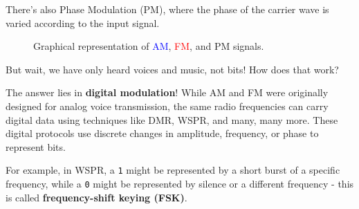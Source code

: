 There's also Phase Modulation (PM), where the phase of the carrier wave is varied according to the input signal.
\begin{figure}[h]
    \centering
    \caption{Graphical representation of \textcolor{blue}{AM}, \textcolor{red}{FM}, and \textcolor{green!50!black}{PM} signals.}\label{fig:modulation_math}
\end{figure}


But wait, we have only heard voices and music, not bits! How does that work?

The answer lies in \textbf{digital modulation}! While AM and FM were originally designed for analog voice transmission, the same radio frequencies can carry digital data using techniques like DMR, WSPR, and many, many more.
These digital protocols use discrete changes in amplitude, frequency, or phase to represent bits.

For example, in WSPR, a \texttt{1} might be represented by a short burst of a specific frequency, while a \texttt{0} might be represented by silence or a different frequency - this is called \textbf{frequency-shift keying (FSK)}.


